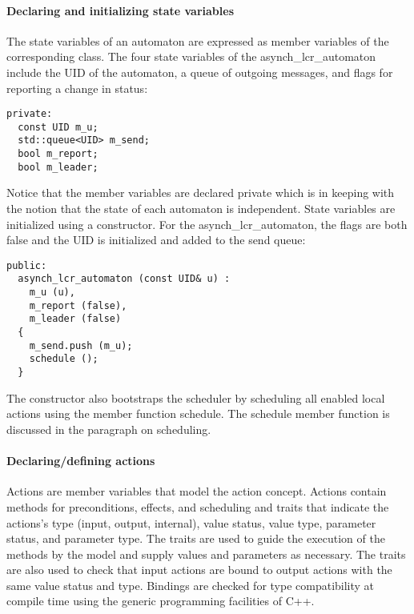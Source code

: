 \paragraph*{Declaring and initializing state variables}
The state variables of an automaton are expressed as member variables of the corresponding class.
The four state variables of the asynch\_lcr\_automaton include the UID of the automaton, a queue of outgoing messages, and flags for reporting a change in status:
\begin{lstlisting}
private:
  const UID m_u;
  std::queue<UID> m_send;
  bool m_report;
  bool m_leader;
\end{lstlisting}
Notice that the member variables are declared private which is in keeping with the notion that the state of each automaton is independent.
State variables are initialized using a constructor.
For the asynch\_lcr\_automaton, the flags are both false and the UID is initialized and added to the send queue:
\begin{lstlisting}
public:
  asynch_lcr_automaton (const UID& u) :
    m_u (u),
    m_report (false),
    m_leader (false)
  {
    m_send.push (m_u);
    schedule ();
  }
\end{lstlisting}
The constructor also bootstraps the scheduler by scheduling all enabled local actions using the member function schedule.
The schedule member function is discussed in the paragraph on scheduling.

\paragraph*{Declaring/defining actions}
Actions are member variables that model the action concept.
Actions contain methods for preconditions, effects, and scheduling and traits that indicate the actions's type (input, output, internal), value status, value type, parameter status, and parameter type.
The traits are used to guide the execution of the methods by the model and supply values and parameters as necessary.
The traits are also used to check that input actions are bound to output actions with the same value status and type.
Bindings are checked for type compatibility at compile time using the generic programming facilities of C++.


